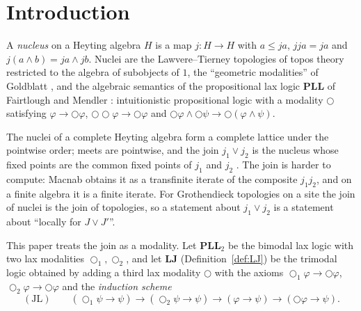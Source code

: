 \documentclass[11pt]{amsart}
\theoremstyle{definition}
\newcommand{\LLJ}{\mathbf{LJ}}
\newcommand{\PLL}{\mathbf{PLL}}
\newcommand{\PLLt}{\mathbf{PLL}_2}
\newcommand{\lax}{\bigcirc}
\newcommand{\laxa}{\bigcirc_1}
\newcommand{\laxb}{\bigcirc_2}
\begin{document}
\section{Introduction}

A \emph{nucleus} on a Heyting algebra $H$ is a map $j\colon H\to H$ with
$a\le ja$, $jja=ja$ and $j(a\wedge b)=ja\wedge jb$. Nuclei are the
Lawvere--Tierney topologies of topos theory restricted to the algebra of
subobjects of $1$, the ``geometric modalities'' of Goldblatt \cite{Goldblatt},
and the algebraic semantics of the propositional lax logic $\PLL$ of
Fairtlough and Mendler \cite{FM}: intuitionistic propositional logic with a
modality $\lax$ satisfying $\varphi\to\lax\varphi$,
$\lax\lax\varphi\to\lax\varphi$ and
$\lax\varphi\wedge\lax\psi\to\lax(\varphi\wedge\psi)$.

The nuclei of a complete Heyting algebra form a complete lattice under the
pointwise order; meets are pointwise, and the join $j_1\vee j_2$ is the nucleus
whose fixed points are the common fixed points of $j_1$ and $j_2$
\cite[II.2]{Johnstone}. The join is harder to compute: Macnab \cite{Macnab}
obtains it as a transfinite iterate of the composite $j_1j_2$, and on a finite
algebra it is a finite iterate. For Grothendieck topologies on a site the join
of nuclei is the join of topologies, so a statement about $j_1\vee j_2$ is a
statement about ``locally for $J\vee J'$''.

This paper treats the join as a modality. Let $\PLLt$ be the bimodal lax logic
with two lax modalities $\laxa,\laxb$, and let $\LLJ$ (Definition~\ref{def:LJ})
be the trimodal logic obtained by adding a third lax modality $\lax$ with the
axioms $\laxa\varphi\to\lax\varphi$, $\laxb\varphi\to\lax\varphi$ and the
\emph{induction scheme}
\[
\mathrm{(JL)}\qquad(\laxa\psi\to\psi)\to(\laxb\psi\to\psi)\to(\varphi\to\psi)\to(\lax\varphi\to\psi).
\]
\end{document}
